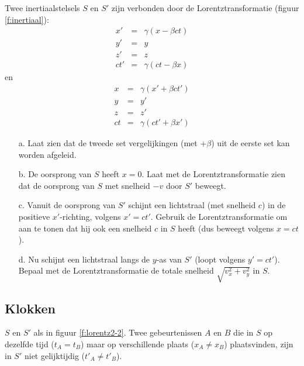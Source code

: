 Twee inertiaalstelsels $S$ en $S'$ zijn verbonden door 
de Lorentztransformatie (figuur \ref{f:inertiaal}):
\begin{eqnarray*}
      x' & = &  \gamma (x - \beta ct) \\
      y' & = &  y  \\ 
      z' & = &  z  \\ 
      ct' & = & \gamma (ct - \beta x) 
\end{eqnarray*}
en
\begin{eqnarray*}
      x & = &  \gamma (x' + \beta ct') \\
      y & = &  y'  \\
      z & = &  z'     \\
      ct & = & \gamma (ct' + \beta x')
\end{eqnarray*}

\begin{itemize}
\item [a.]
  Laat  zien  dat  de tweede set vergelijkingen (met +$\beta$) uit 
de eerste set kan worden afgeleid. 
\item [b.]
  De oorsprong van $S$ heeft $x = 0$. 
Laat met de Lorentztransformatie zien dat de oorsprong van $S$ met 
snelheid $-v$ door 
$S'$ beweegt.
\item [c.]
  Vanuit  de oorsprong van $S'$ schijnt een lichtstraal (met snelheid $c$) 
in de positieve $x'$-richting, volgens $x' = ct'$.  
Gebruik  de  Lorentztransformatie  om  aan te tonen dat hij ook een 
snelheid $c$ in $S$ heeft (dus beweegt volgens $x = ct$). 
\item [d.]
  Nu  schijnt een  lichtstraal  langs  de  $y$-as  van  $S'$  (loopt  volgens  
$y'=ct'$).  
Bepaal  met de Lorentztransformatie de totale snelheid 
$\sqrt{v^{2}_{x}+v^{2}_{y}}$ in $S$.
\end{itemize}

\subsection{Klokken}
$S$  en $S'$ als in figuur \ref{f:lorentz2-2}. 
Twee gebeurtenissen $A$ en $B$ die in $S$ op  dezelfde  tijd  ($t_{A}=t_{B}$)  
maar  op  verschillende  plaats  ($x_{A}\neq x_{B}$) plaatsvinden, 
zijn in $S'$ niet gelijktijdig ($t'_{A}\neq t'_{B}$).

